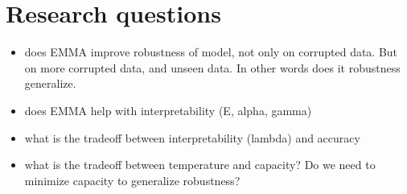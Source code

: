 
\section{Research questions}
\begin{itemize}
\item does EMMA improve robustness of model, not only on corrupted data. But on more corrupted data, and unseen data. In other words does it robustness generalize.
\item does EMMA help with interpretability (E, alpha, gamma)
\item what is the tradeoff between interpretability (lambda) and accuracy
\item what is the tradeoff between temperature and capacity? Do we need to minimize capacity to generalize robustness?
\end{itemize}